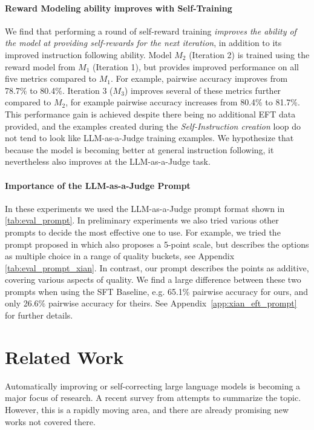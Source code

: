 \documentclass{article}
\begin{document}
\paragraph{Reward Modeling ability improves with Self-Training}
We find that performing a round of self-reward training {\em improves the ability of the model at providing self-rewards for the next iteration}, in addition to its improved instruction following ability. Model $M_2$ (Iteration 2) is trained using the reward model from $M_1$ (Iteration 1), but provides improved performance on all five metrics compared to $M_1$.
For example,  pairwise accuracy  improves from 78.7\% to 80.4\%.
Iteration 3 ($M_3$) improves several of these metrics further compared to $M_2$, for example pairwise accuracy increases from 80.4\% to 81.7\%.
This performance gain is achieved despite there being no additional 
EFT data provided, and the examples created during the {\em Self-Instruction creation} loop do not tend to look like LLM-as-a-Judge training examples. We hypothesize that because the model is becoming better at general instruction following, it nevertheless also improves at
the  LLM-as-a-Judge task.

\paragraph{Importance of the LLM-as-a-Judge Prompt}
In these experiments we used the LLM-as-a-Judge prompt format shown  in  \autoref{tab:eval_prompt}.
In preliminary experiments we also tried various other prompts to decide the most effective one to use. For example, we tried the prompt proposed in \citet{li2023self} which also proposes a 5-point scale, but describes the options as multiple choice in a range of quality buckets, see Appendix \autoref{tab:eval_prompt_xian}.
 In contrast, our prompt describes the points as additive, covering various aspects of quality. We find a large difference between these two prompts when using the SFT Baseline, e.g. 65.1\% pairwise accuracy for ours, and only 26.6\% pairwise accuracy for theirs. See Appendix~\ref{app:xian_eft_prompt} for further details.
 


\section{Related Work}

Automatically improving or self-correcting large language models is becoming
a major focus of research. A recent survey from \citet{pan2023automatically}
attempts to summarize the topic. However, this is a rapidly moving area, and 
there are already promising new works not covered there.
\end{document}

